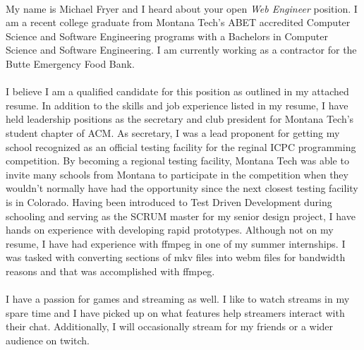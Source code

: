 \paragraph{}
My name is Michael Fryer and I heard about your open \textit{Web Engineer} position. I am a recent college graduate from Montana Tech's ABET accredited Computer Science and Software Engineering programs with a Bachelors in Computer Science and Software Engineering. I am currently working as a contractor for the Butte Emergency Food Bank.

\paragraph{}
I believe I am a qualified candidate for this position as outlined in my attached resume. In addition to the skills and job experience listed in my resume, I have held leadership positions as the secretary and club president for Montana Tech's student chapter of ACM. As secretary, I was a lead proponent for getting my school recognized as an official testing facility for the reginal ICPC programming competition. By becoming a regional testing facility, Montana Tech was able to invite many schools from Montana to participate in the competition when they wouldn't normally have had the opportunity since the next closest testing facility is in Colorado. Having been introduced to Test Driven Development during schooling and serving as the SCRUM master for my senior design project, I have hands on experience with developing rapid prototypes. Although not on my resume, I have had experience with ffmpeg in one of my summer internships. I was tasked with converting sections of mkv files into webm files for bandwidth reasons and that was accomplished with ffmpeg.

\paragraph{}
I have a passion for games and streaming as well. I like to watch streams in my spare time and I have picked up on what features help streamers interact with their chat. Additionally, I will occasionally stream for my friends or a wider audience on twitch.